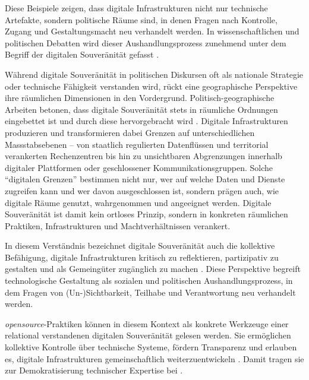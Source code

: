 Diese Beispiele zeigen, dass digitale Infrastrukturen nicht nur technische Artefakte, sondern politische Räume sind, in denen Fragen nach Kontrolle, Zugang und Gestaltungsmacht neu verhandelt werden. In wissenschaftlichen und politischen Debatten wird dieser Aushandlungsprozess zunehmend unter dem Begriff der digitalen Souveränität gefasst \parencite{glaszeContestedSpatialitiesDigital2023}.

Während digitale Souveränität in politischen Diskursen oft als nationale Strategie oder technische Fähigkeit verstanden wird, rückt eine geographische Perspektive ihre räumlichen Dimensionen in den Vordergrund. Politisch-geographische Arbeiten betonen, dass digitale Souveränität stets in räumliche Ordnungen eingebettet ist und durch diese hervorgebracht wird \parencite{glaszeContestedSpatialitiesDigital2023,zhangBordersBorderingSovereignty2023}. Digitale Infrastrukturen produzieren und transformieren dabei Grenzen auf unterschiedlichen Massstabsebenen -- von staatlich regulierten Datenflüssen und territorial verankerten Rechenzentren bis hin zu unsichtbaren Abgrenzungen innerhalb digitaler Plattformen oder geschlossener Kommunikationsgruppen. Solche \enquote{digitalen Grenzen} bestimmen nicht nur, wer auf welche Daten und Dienste zugreifen kann und wer davon ausgeschlossen ist, sondern prägen auch, wie digitale Räume genutzt, wahrgenommen und angeeignet werden. Digitale Souveränität ist damit kein ortloses Prinzip, sondern in konkreten räumlichen Praktiken, Infrastrukturen und Machtverhältnissen verankert.

In diesem Verständnis bezeichnet digitale Souveränität auch die kollektive Befähigung, digitale Infrastrukturen kritisch zu reflektieren, partizipativ zu gestalten und als Gemeingüter zugänglich zu machen \parencite{baackDataficationEmpowermentHow2015,glaszeContestedSpatialitiesDigital2023}. Diese Perspektive begreift technologische Gestaltung als sozialen und politischen Aushandlungsprozess, in dem Fragen von (Un-)Sichtbarkeit, Teilhabe und Verantwortung neu verhandelt werden.

\emph{\gls{opensource}}-Praktiken können in diesem Kontext als konkrete Werkzeuge einer relational verstandenen digitalen Souveränität gelesen werden. Sie ermöglichen kollektive Kontrolle über technische Systeme, fördern Transparenz und erlauben es, digitale Infrastrukturen gemeinschaftlich weiterzuentwickeln \parencite{gurumurthyDataBodiesNew2022}. Damit tragen sie zur Demokratisierung technischer Expertise bei \parencite{baackDataficationEmpowermentHow2015, pohleDigitalSovereignty2020}.

